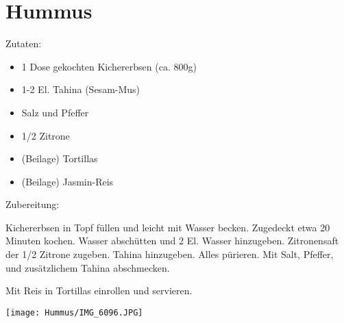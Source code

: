 \section{Hummus}
Zutaten:
\begin{itemize}
    \item 1 Dose gekochten Kichererbsen (ca. 800g)
    \item 1-2 El. Tahina (Sesam-Mus)
    \item Salz und Pfeffer
    \item 1/2 Zitrone
    \item (Beilage) Tortillas
    \item (Beilage) Jasmin-Reis
\end{itemize}


\noindent Zubereitung:

\noindent Kichererbsen in Topf füllen und leicht mit Wasser becken. Zugedeckt etwa 20 Minuten kochen. Wasser abschütten und 2 El. Wasser hinzugeben. Zitronensaft der 1/2 Zitrone zugeben. Tahina hinzugeben. Alles pürieren. Mit Salt, Pfeffer, und zusätzlichem Tahina abschmecken.

Mit Reis in Tortillas einrollen und servieren.

\newpage
\mbox{}
\vfill
\begin{center}
    \texttt{[image: Hummus/IMG\_6096.JPG]}
\end{center}
\vfill
\mbox{ }
\newpage
